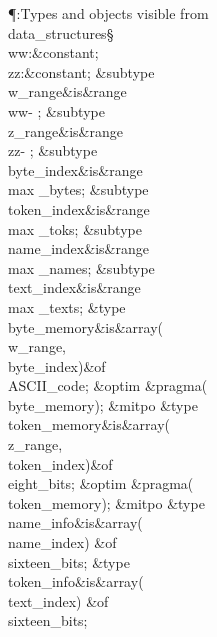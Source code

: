 \Y\P\?\4:Types and objects visible from \\{data\_structures}\X\mathrel{+}\S%
\?\6
\\{ww}\?:\?\&{constant}\8\?\K{};\6
\\{zz}\?:\?\&{constant}\8\?\K{};\7
\&{subtype}\8\\{w\_range}\8\&{is}\8\8\&{range}\?\to\?\\{ww}\?-%
;\6
\&{subtype}\8\\{z\_range}\8\&{is}\8\8\&{range}\?\to\?\\{zz}\?-%
;\6
\&{subtype}\8\\{byte\_index}\8\&{is}\8\8\&{range}\?\to\?\\{max%
\_bytes};\6
\&{subtype}\8\\{token\_index}\8\&{is}\8\8\&{range}\?\to\?\\{max%
\_toks};\6
\&{subtype}\8\\{name\_index}\8\&{is}\8\8\&{range}\?\to\?\\{max%
\_names};\6
\&{subtype}\8\\{text\_index}\8\&{is}\8\8\&{range}\?\to\?\\{max%
\_texts};\7
\&{type}\8\\{byte\_memory}\8\&{is}\?\8\1\&{array}\8\1(\?\\{w\_range}\?,\?%
\\{byte\_index}\?\2)\2\8\&{of}\?\8\\{ASCII\_code};\6
\&{optim}\1\6
\&{pragma}\8\1\?\1(\?\\{byte\_memory}\?\2)\?\2;\2\6
\&{mitpo}\7
\&{type}\8\\{token\_memory}\8\&{is}\?\8\1\&{array}\8\1(\?\\{z\_range}\?,\?%
\\{token\_index}\?\2)\2\8\&{of}\?\8\\{eight\_bits};\6
\&{optim}\1\6
\&{pragma}\8\1\?\1(\?\\{token\_memory}\?\2)\?\2;\2\6
\&{mitpo}\7
\&{type}\8\\{name\_info}\8\&{is}\?\8\1\&{array}\8\1(\?\\{name\_index}\?\2)\2\8%
\&{of}\?\8\\{sixteen\_bits};\6
\&{type}\8\\{token\_info}\8\&{is}\?\8\1\&{array}\8\1(\?\\{text\_index}\?\2)\2\8%
\&{of}\?\8\\{sixteen\_bits};\7
